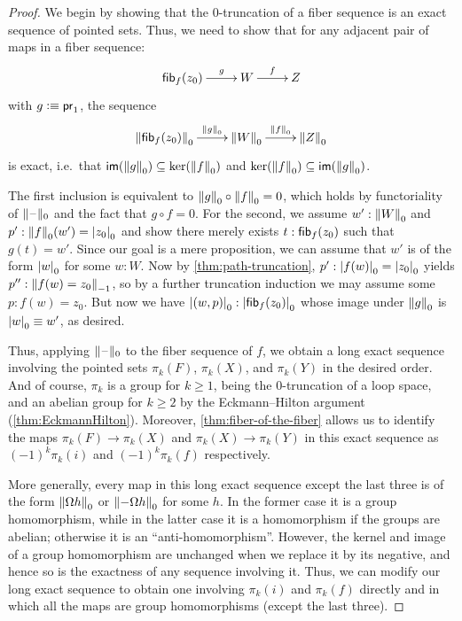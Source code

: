 \begin{proof}
  We begin by showing that the 0-truncation of a fiber sequence is an exact sequence of pointed sets.
  Thus, we need to show that for any adjacent pair of maps in a fiber sequence:
  \[\xymatrix{\hfib{f}{z_0} \ar^-g[r] & W \ar^-f[r] & Z}\]
  with $g\defeq \proj1$, the sequence
  \[\xymatrix{\trunc{0}{\hfib{f}{z_0}} \ar^-{\trunc0g}[r] & \trunc0{W}
    \ar^-{\trunc0{f}}[r] & \trunc0{Z}}\]
  is exact, i.e.\ that $\im(\trunc0g)\subseteq\ker(\trunc0f)$ and $\ker(\trunc0f)\subseteq\im(\trunc0g)$.

  The first inclusion is equivalent to $\trunc0g\circ\trunc0f=0$, which holds by functoriality of $\truncf0$ and the fact that $g\circ f=0$.
  For the second, we assume $w':\trunc0W$ and $p':\trunc0f(w')=\tproj0{z_0}$ and show there merely exists ${t:\hfib{f}{z_0}}$ such that $g(t)=w'$.
  Since our goal is a mere proposition, we can assume that $w'$ is of the
  form $\tproj0w$ for some $w:W$.
  Now by \autoref{thm:path-truncation}, $p' : \tproj0{f(w)}=\tproj0{z_0}$ yields $p'': \trunc{-1}{f(w)=z_0}$, so by a further truncation induction we may assume some $p:f(w)=z_0$.
  But now we have $\tproj0{(w,p)}:\tproj0{\hfib{f}{z_0}}$ whose image under $\trunc0g$ is $\tproj0w\jdeq w'$, as desired.

  Thus, applying $\truncf0$ to the fiber sequence of $f$, we obtain a long exact sequence involving the pointed sets $\pi_k(F)$, $\pi_k(X)$, and $\pi_k(Y)$ in the desired order.
  And of course, $\pi_k$ is a group for $k\ge1$, being the 0-truncation of a loop space, and an abelian group for $k\ge 2$ by the Eckmann--Hilton argument
   (\autoref{thm:EckmannHilton}).
  Moreover, \autoref{thm:fiber-of-the-fiber} allows us to identify the maps $\pi_k(F) \to \pi_k(X)$ and $\pi_k(X) \to \pi_k(Y)$ in this exact sequence as $(-1)^k \pi_k(i)$ and $(-1)^k \pi_k(f)$ respectively.

  More generally, every map in this long exact sequence except the last three is of the form $\trunc0{\Omega h}$ or $\trunc0{-\Omega h}$ for some $h$.
  In the former case it is a group homomorphism, while in the latter case it is a homomorphism if the groups are abelian; otherwise it is an ``anti-homomorphism''.
  However, the kernel and image of a group homomorphism are unchanged when we replace it by its negative, and hence so is the exactness of any sequence involving it.
  Thus, we can modify our long exact sequence to obtain one involving $\pi_k(i)$ and $\pi_k(f)$ directly and in which all the maps are group homomorphisms (except the last three).
\end{proof}

